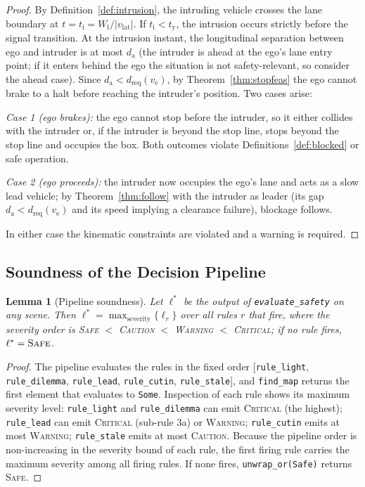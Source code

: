 \documentclass[conference, a4paper]{IEEEtran}
\theoremstyle{plain}
\newtheorem{lemma}[theorem]{Lemma}
\newcommand{\dreq}{d_{\mathrm{req}}}
\newcommand{\da}{d_{\mathrm{a}}}
\newcommand{\tred}{t_{\mathrm{y}}}
\newcommand{\tint}{t_{\mathrm{i}}}
\newcommand{\Wl}{W_{\mathrm{l}}}
\newcommand{\ve}{v_{\mathrm{e}}}
\newcommand{\vlat}{v_{\mathrm{lat}}}
\begin{document}
\begin{proof}
By Definition~\ref{def:intrusion}, the intruding vehicle crosses the lane
boundary at $t = \tint = \Wl/|\vlat|$. If $\tint < \tred$, the intrusion
occurs strictly before the signal transition. At the intrusion instant, the
longitudinal separation between ego and intruder is at most $\da$ (the
intruder is ahead at the ego's lane entry point; if it enters behind the ego
the situation is not safety-relevant, so consider the ahead case). Since
$\da < \dreq(\ve)$, by Theorem~\ref{thm:stopfeas} the ego cannot brake to a
halt before reaching the intruder's position. Two cases arise:

\emph{Case 1 (ego brakes):} the ego cannot stop before the intruder, so it
either collides with the intruder or, if the intruder is beyond the stop
line, stops beyond the stop line and occupies the box. Both outcomes violate
Definitions~\ref{def:blocked} or safe operation.

\emph{Case 2 (ego proceeds):} the intruder now occupies the ego's lane and
acts as a slow lead vehicle; by Theorem~\ref{thm:follow} with the intruder as
leader (its gap $\da < \dreq(\ve)$ and its speed implying a clearance
failure), blockage follows.

In either case the kinematic constraints are violated and a warning is
required.
\end{proof}

\subsection{Soundness of the Decision Pipeline}

\begin{lemma}[Pipeline soundness]
\label{lem:pipeline}
Let $\ell^*$ be the output of \texttt{evaluate\_safety} on any scene. Then
$\ell^* = \max_{\text{severity}} \{\ell_r\}$ over all rules $r$ that fire,
where the severity order is
\textsc{Safe} $<$ \textsc{Caution} $<$ \textsc{Warning} $<$
\textsc{Critical}; if no rule fires, $\ell^* = \textsc{Safe}$.
\end{lemma}

\begin{proof}
The pipeline evaluates the rules in the fixed order
[\texttt{rule\_light}, \texttt{rule\_dilemma}, \texttt{rule\_lead},
\texttt{rule\_cutin}, \texttt{rule\_stale}], and \texttt{find\_map} returns
the first element that evaluates to \texttt{Some}. Inspection of each rule
shows its maximum severity level: \texttt{rule\_light} and
\texttt{rule\_dilemma} can emit \textsc{Critical} (the highest);
\texttt{rule\_lead} can emit \textsc{Critical} (sub-rule 3a) or
\textsc{Warning}; \texttt{rule\_cutin} emits at most \textsc{Warning};
\texttt{rule\_stale} emits at most \textsc{Caution}. Because the pipeline
order is non-increasing in the severity bound of each rule, the first firing
rule carries the maximum severity among all firing rules. If none fires,
\texttt{unwrap\_or(Safe)} returns \textsc{Safe}.
\end{proof}
\end{document}

